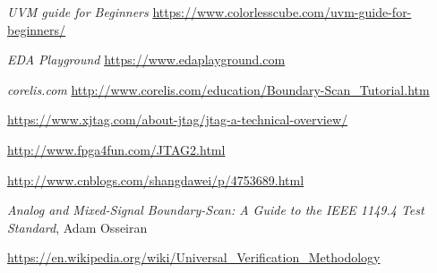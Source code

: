 \documentclass[a4paper,11pt]{article}
\begin{document}
\begin{thebibliography}{i}
 {\em UVM guide for Beginners}
\url{https://www.colorlesscube.com/uvm-guide-for-beginners/}

 {\em EDA Playground}
\url{https://www.edaplayground.com}

 {\em corelis.com}
\url{http://www.corelis.com/education/Boundary-Scan_Tutorial.htm}

\url{https://www.xjtag.com/about-jtag/jtag-a-technical-overview/}

\url{http://www.fpga4fun.com/JTAG2.html}

\url{http://www.cnblogs.com/shangdawei/p/4753689.html}

 {\em Analog and Mixed-Signal Boundary-Scan: A Guide to the IEEE 1149.4 Test Standard}, Adam Osseiran

\url{https://en.wikipedia.org/wiki/Universal_Verification_Methodology}

\end{thebibliography} 
%
%
% 
 
\end{document}
